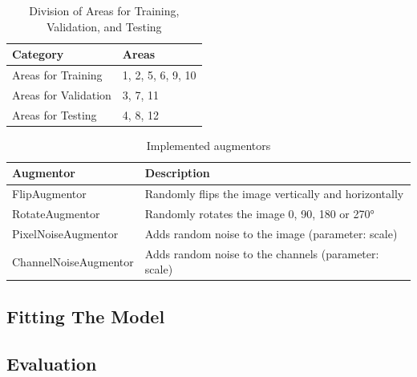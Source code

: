 \begin{table}[h!]
    \centering
        \begin{tabular}{|l|l|}
        \hline
        \textbf{Category}          & \textbf{Areas}       \\ 
        \hline
        Areas for Training         & 1, 2, 5, 6, 9, 10   \\
        Areas for Validation       & 3, 7, 11            \\
        Areas for Testing          & 4, 8, 12            \\ 
        \hline
        \end{tabular}
    \caption{Division of Areas for Training, Validation, and Testing}
    \label{tab:areas}
\end{table}

\begin{table}[H]
    \centering
        \begin{tabular}{|l|l|}
        \hline
        \textbf{Augmentor} & \textbf{Description} \\
        \hline
        FlipAugmentor & Randomly flips the image vertically and horizontally\\
        RotateAugmentor & Randomly rotates the image 0, 90, 180 or 270° \\
        PixelNoiseAugmentor & Adds random noise to the image (parameter: scale) \\
        ChannelNoiseAugmentor & Adds random noise to the channels (parameter: scale) \\
        \hline
        \end{tabular}
    \caption{Implemented augmentors}
    \label{tab:augmentors}
\end{table}



\subsection{Fitting The Model}%


\subsection{Evaluation}%
